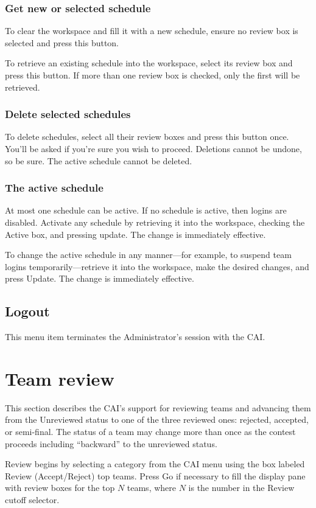 \documentclass[11pt,letterpaper]{refart}
\def\ui#1{\textsf{#1}}
\begin{document}
\subsubsection{Get new or selected schedule}
To clear the workspace and fill it with a new schedule, ensure no 
review box is selected and press this button.

To retrieve an existing schedule into the workspace, select 
its review box and press this button.  If more than one review box is
checked, only the first will be retrieved. 

\subsubsection{Delete selected schedules}
To delete schedules, select all their review boxes and press this button
once.  You'll be asked if you're sure you wish to proceed.  Deletions cannot
be undone, so be sure.  The active schedule cannot be deleted.

\subsubsection{The active schedule}
At most one schedule can be active.  If no schedule is active, then logins are disabled.
Activate any schedule by retrieving it into the workspace, checking the \ui{Active} box,
and pressing \ui{update}.  The change is immediately effective.

To change the active schedule in any manner---for example, to suspend team logins
temporarily---retrieve it into the workspace, make the desired changes, and press
\ui{Update}.  The change is immediately effective.

\subsection{Logout}
This menu item terminates the Administrator's session with the CAI.

\section{Team review}
This section describes the CAI's support for reviewing teams and advancing
them from the Unreviewed status to one of the three reviewed ones: rejected,
accepted, or semi-final.  The status of a team may change more than once as
the contest proceeds including ``backward'' to the unreviewed status.

Review begins by selecting a category from the CAI menu using the box labeled
\ui{Review (Accept/Reject) top teams}.  Press \ui{Go} if necessary to fill
the display pane with review boxes for the top $N$ teams, where $N$ is the number
in the \ui{Review cutoff} selector. 
\end{document}
